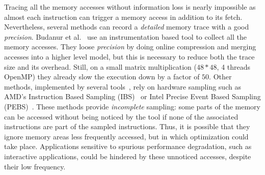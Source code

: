 Tracing all the memory accesses without information loss is nearly impossible as
almost each instruction can trigger a memory access in addition to its fetch. Nevertheless, several methods
can record a \emph{detailed} memory trace with a good \emph{precision}.
%
Budanur et al.~\cite{Budanur11Memory} use an instrumentation based tool to
collect all the memory accesses. They loose \emph{precision} by doing online compression and merging accesses
into a higher level model, but this is necessary to reduce both the trace size and its overhead.
Still, on a small matrix multiplication ($48*48$, 4 threads OpenMP) they already
slow the execution down by a factor of $50$.
Other methods, implemented by several
tools~\cite{Lachaize12MemProf,McCurdy10Memphis,Liu14Tool,Gimenez14Dissecting},
rely on hardware sampling such as AMD's Instruction Based Sampling
(IBS)~\cite{Drongowski07Instructionbased} or Intel Precise Event Based
Sampling (PEBS)~\cite{Levinthal2009}.  These methods provide \emph{incomplete}
sampling: some parts of the memory can be accessed without being noticed by
the tool if none of the associated instructions are part of the sampled
instructions.  Thus, it is possible that they ignore memory areas
less frequently accessed, but in which optimization could take place.
Applications sensitive to spurious performance
degradation, such as interactive applications, could be hindered by these
unnoticed accesses, despite their low frequency.
%
%

